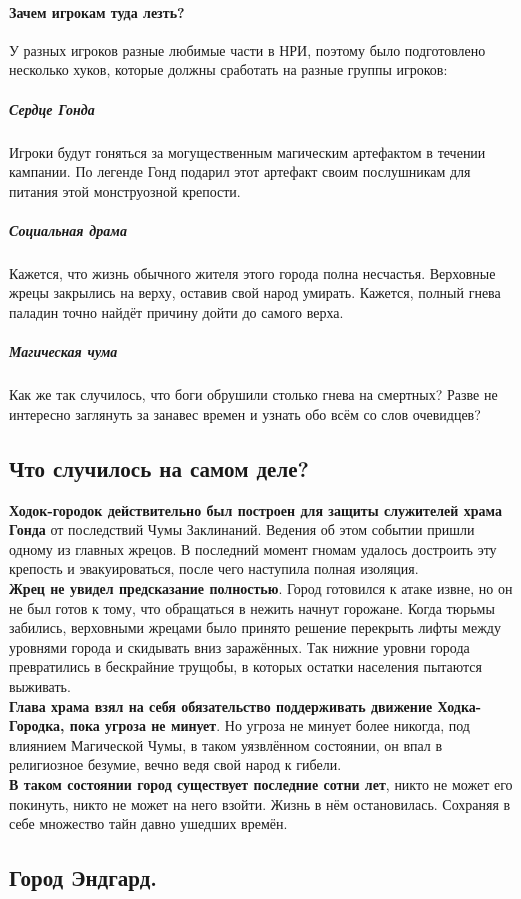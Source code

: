 \documentclass[a4paper,12pt,twoside,twocolumn]{book}
\begin{document}
\paragraph{Зачем игрокам туда лезть?}
У разных игроков разные любимые части в НРИ, поэтому было подготовлено несколько хуков, которые должны сработать на разные группы игроков:
\subparagraph{Сердце Гонда}
Игроки будут гоняться за могущественным магическим артефактом в течении кампании. По легенде Гонд подарил этот артефакт своим послушникам для питания этой монструозной 
крепости.
\subparagraph{Социальная драма}
Кажется, что жизнь обычного жителя этого города полна несчастья. Верховные жрецы закрылись на верху, оставив свой народ умирать. Кажется, полный гнева паладин точно найдёт 
причину дойти до самого верха.
\subparagraph{Магическая чума}
Как же так случилось, что боги обрушили столько гнева на смертных? Разве не интересно заглянуть за занавес времен и узнать обо всём со слов очевидцев?
\subsection{Что случилось на самом деле?}
\textbf{Ходок-городок действительно был построен для защиты служителей храма Гонда} от последствий Чумы Заклинаний. Ведения об этом событии пришли одному из главных жрецов. 
В последний момент гномам удалось достроить эту крепость и эвакуироваться, после чего наступила полная изоляция.
\\
\textbf{Жрец не увидел предсказание полностью}. Город готовился к атаке извне, но он не был готов к тому, что обращаться в нежить начнут горожане. Когда тюрьмы забились, 
верховными жрецами было принято решение перекрыть лифты между уровнями города и скидывать вниз заражённых. Так нижние уровни города превратились в бескрайние трущобы, в 
которых остатки населения пытаются выживать.
\\
\textbf{Глава храма взял на себя обязательство поддерживать движение Ходка-Городка, пока угроза не минует}. Но угроза не минует более никогда, под влиянием Магической Чумы, 
в таком уязвлённом состоянии, он впал в религиозное безумие, вечно ведя свой народ к гибели.
\\
\textbf{В таком состоянии город существует последние сотни лет}, никто не может его покинуть, никто не может на него взойти. Жизнь в нём остановилась. Сохраняя в себе множество 
тайн давно ушедших времён.
\subsection{Город Эндгард.}
\end{document}
